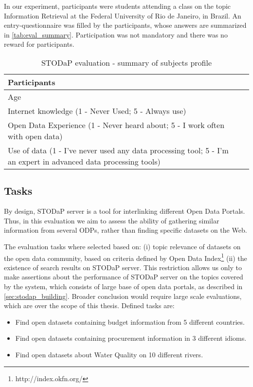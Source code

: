 In our experiment, participants were students attending a class on the topic Information Retrieval at the Federal University of Rio de Janeiro, in Brazil.
An entry-questionnaire was filled by the participants, whose answers are summarized in \autoref{tab:eval_summary}.
Participation was not mandatory and there was no reward for participants.

\begin{table}[]
\ABNTEXfontereduzida
\centering
\caption{STODaP evaluation - summary of subjects profile}
\label{tab:eval_summary}
\begin{tabular}{|p{8cm}|p{2cm}|}
\hline
Participants & \\ \hline
Age & \\ \hline
Internet knowledge (1 - Never Used; 5 - Always use) & \\ \hline
Open Data Experience (1 - Never heard about; 5 - I work often with open data) & \\ \hline
Use of data (1 - I've never used any data processing tool; 5 - I'm an expert in advanced data processing tools) & \\ \hline
\end{tabular}
\end{table}

\subsection{Tasks}

By design, STODaP server is a tool for interlinking different Open Data Portals.
Thus, in this evaluation we aim to assess the ability of gathering similar information from several ODPs, rather than finding specific datasets on the Web.

The evaluation tasks where selected based on: (i) topic relevance of datasets on the open data community, based on criteria defined by Open Data Index\footnote{http://index.okfn.org/} (ii) the existence of search results on STODaP server.
This restriction allows us only to make assertions about the performance of STODaP server on the topics covered by the system, which consists of large base of open data portals, as described in \autoref{sec:stodap_building}.
Broader conclusion would require large scale evaluations, which are over the scope of this thesis.
Defined tasks are:

\begin{itemize}
	\item Find open datasets containing budget information from 5 different countries.
	\item Find open datasets containing procurement information in 3 different idioms.
	\item Find open datasets about Water Quality on 10 different rivers.
\end{itemize}

